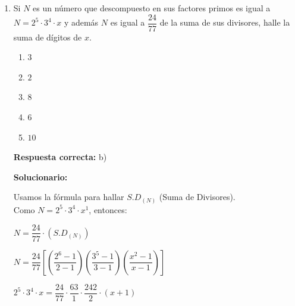 \begin{enumerate}
	\textbf{Respuesta correcta:} d)
	
	\vspace{2mm}
	\textbf{Solucionario:}
	
	Sea el número: $\overline{1abcde}$ \\
	Dato: $\overline{abcde1} = 3(\overline{1abcde})$
	
	Descomponiendo resulta:
	\begin{align*}
		10(\overline{abcde}) + 1 &= 3(10^5 + \overline{abcde}) \\
		10(\overline{abcde}) + 1 &= 300\,000 + 3(\overline{abcde}) \\
	7(\overline{abcde}) &= 300,000 - 1 \\
	7(\overline{abcde}) &= 299,999 \\
	\overline{abcde} &= 42,857
	\end{align*}
	
	Piden $\overline{1abcde} $ 
	
	\vspace{6mm}
	
	\item Si $N$ es un número que descompuesto en sus factores primos es igual a $N = 2^5 \cdot 3^4 \cdot x$ y además $N$ es igual a $\dfrac{24}{77}$ de la suma de sus divisores, halle  la suma de dígitos de $x$.
	
	\begin{enumerate}[label=\alph*)]
		\item $3$
		\item $2$
		\item $8$
		\item $6$
		\item $10$
	\end{enumerate}
	
	\textbf{Respuesta correcta:} b)
	
	\vspace{2mm}
	\textbf{Solucionario:}
	
	Usamos la fórmula para hallar $S.D_{(N)}$ (Suma de Divisores). \\
	Como $N = 2^5 \cdot 3^4 \cdot x^1$, entonces:
	
	$ N = \dfrac{24}{77} \cdot (S.D_{(N)}) $
	
	$N = \dfrac{24}{77} \left[ \left( \dfrac{2^6 - 1}{2 - 1} \right) \left( \dfrac{3^5 - 1}{3 - 1} \right) \left( \dfrac{x^2 - 1}{x - 1} \right) \right] $
	
		$2^5 \cdot 3^4 \cdot x = \dfrac{24}{77} \cdot \dfrac{63}{1} \cdot \dfrac{242}{2} \cdot (x + 1)$ \\
		

\end{enumerate}
